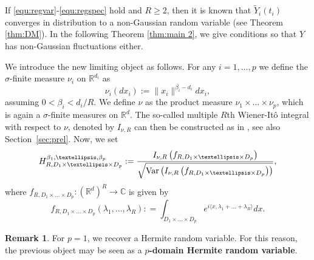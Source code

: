 \documentclass[12pt]{article}
\DeclareMathOperator{\var}{Var}
\DeclareMathOperator{\1}{1}
\newcommand{\R}{\mathbb{R}}
\theoremstyle{plain}
\theoremstyle{definition}
\newtheorem{remark}{Remark}
\begin{document}
If \eqref{equ:regvar}-\eqref{equ:regspec} hold and $R\ge2$, then it is known that $\widetilde Y_i(t_i)$ converges in distribution to a non-Gaussian random variable (see Theorem \ref{thm:DM}). In the following Theorem \ref{thm:main 2}, we give conditions so that $Y$  has non-Gaussian fluctuations either. {We introduce the new limiting object as follows. For any $i=1,\ldots,p$ we define the $\sigma$-finite measure $\nu_i$ on $\R^{d_i}$ as \begin{equation}
    \nu_i(dx_i):=\|x_i\|^{\beta_i-d_i}dx_i, 
\end{equation}
assuming $0<\beta_i<d_i/R$. We define  $\nu$ as the product measure $\nu_1\times\ldots\times \nu_p$, which is again a $\sigma$-finite measures on $\R^{d}$. The so-called multiple $R$th Wiener-It\^o integral with respect to $\nu$, denoted by $I_{\nu,R}$ can then be constructed as in \cite{M81}, see also Section~\ref{sec:prel}. Now, we set \begin{equation}
    H^{\beta_1, \ldots, \beta_p}_{R, D_1\times \ldots \times D_p} := \frac{{\rm }I_{\nu,R}\left(f_{R,D_1\times\ldots\times D_p}\right)}{\sqrt{\var\left(I_{\nu,R}\left(f_{R,D_1\times\ldots\times D_p}\right)\right)}},
\end{equation}
where $f_{R,D_1\times\ldots\times D_p}: (\mathbb R^d)^R \to \mathbb C$ is given by
     \begin{equation}\label{equ:fNonCen}
    f_{R,D_1\times\ldots\times D_p}(\lambda_1,\dots,\lambda_R) \colon = \int_{D_1\times\ldots\times D_p} e^{i\langle x,\lambda_1+\dots+\lambda_R\rangle} dx.
\end{equation}
     \begin{remark}
     For $p=1$, we recover a Hermite random variable. For this reason, the previous object may be seen as a \textbf{$p$-domain Hermite random variable}.
     \end{remark}
     }
\end{document}
